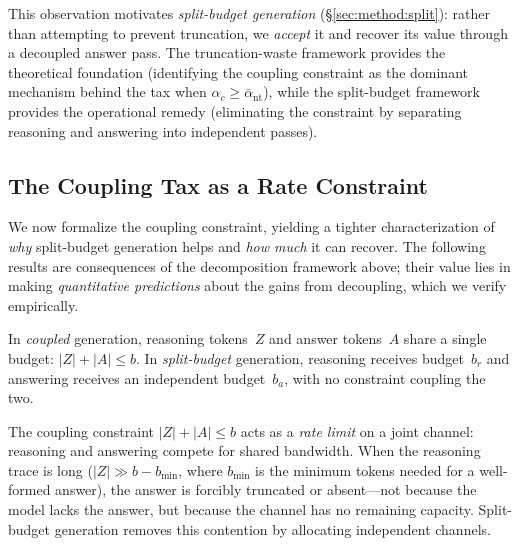 \noindent
This observation motivates \emph{split-budget generation}
(\S\ref{sec:method:split}): rather than attempting to prevent
truncation, we \emph{accept} it and recover its value through a
decoupled answer pass.
The truncation-waste framework provides the theoretical foundation
(identifying the coupling constraint as the dominant mechanism behind the
tax when $\alpha_c \ge \bar{\alpha}_{\mathrm{nt}}$), while the split-budget framework provides the operational remedy
(eliminating the constraint by separating reasoning and answering
into independent passes).

\subsection{The Coupling Tax as a Rate Constraint}
\label{sec:theory:coupling}

We now formalize the coupling constraint, yielding a tighter
characterization of \emph{why} split-budget generation helps and
\emph{how much} it can recover.
The following results are consequences of the decomposition framework
above; their value lies in making \emph{quantitative predictions} about
the gains from decoupling, which we verify empirically.

\begin{definition}
\label{def:coupled-split}
In \emph{coupled} generation, reasoning tokens~$Z$ and answer tokens~$A$
share a single budget: $|Z| + |A| \le b$.
In \emph{split-budget} generation, reasoning receives budget~$b_r$ and
answering receives an independent budget~$b_a$, with no constraint
coupling the two.
\end{definition}

\noindent
The coupling constraint $|Z|+|A| \le b$ acts as a \emph{rate limit}
on a joint channel: reasoning and answering compete for shared bandwidth.
When the reasoning trace is long ($|Z| \gg b - b_{\min}$, where $b_{\min}$
is the minimum tokens needed for a well-formed answer), the answer is
forcibly truncated or absent---not because the model lacks the answer, but
because the channel has no remaining capacity.
Split-budget generation removes this contention by allocating
independent channels.

